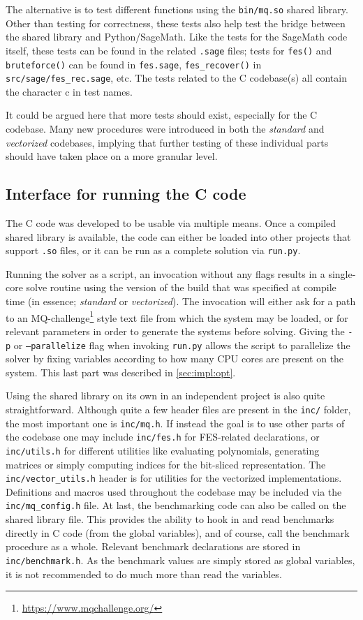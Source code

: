 The alternative is to test different functions using the \texttt{bin/mq.so} shared library. Other than testing for correctness, these tests also help test the bridge between the shared library and Python/SageMath. Like the tests for the SageMath code itself, these tests can be found in the related \texttt{.sage} files; tests for \texttt{fes()} and \texttt{bruteforce()} can be found in \texttt{fes.sage}, \texttt{fes\_recover()} in \texttt{src/sage/fes\_rec.sage}, etc. The tests related to the C codebase(s) all contain the character c in test names.

It could be argued here that more tests should exist, especially for the C codebase. Many new procedures were introduced in both the \textit{standard} and \textit{vectorized} codebases, implying that further testing of these individual parts should have taken place on a more granular level. 

\subsection{Interface for running the C code} \label{sec:impl:interface}
The C code was developed to be usable via multiple means. Once a compiled shared library is available, the code can either be loaded into other projects that support \texttt{.so} files, or it can be run as a complete solution via \texttt{run.py}. 

Running the solver as a script, an invocation without any flags results in a single-core solve routine using the version of the build that was specified at compile time (in essence; \textit{standard} or \textit{vectorized}). The invocation will either ask for a path to an MQ-challenge\footnote{\url{https://www.mqchallenge.org/}} style text file from which the system may be loaded, or for relevant parameters in order to generate the systems before solving. Giving the \texttt{-p} or \texttt{--parallelize} flag when invoking \texttt{run.py} allows the script to parallelize the solver by fixing variables according to how many CPU cores are present on the system. This last part was described in \cref{sec:impl:opt}.

Using the shared library on its own in an independent project is also quite straightforward. Although quite a few header files are present in the \texttt{inc/} folder, the most important one is \texttt{inc/mq.h}. If instead the goal is to use other parts of the codebase one may include \texttt{inc/fes.h} for FES-related declarations, or \texttt{inc/utils.h} for different utilities like evaluating polynomials, generating matrices or simply computing indices for the bit-sliced representation. The \texttt{inc/vector\_utils.h} header is for utilities for the vectorized implementations. Definitions and macros used throughout the codebase may be included via the \texttt{inc/mq\_config.h} file. At last, the benchmarking code can also be called on the shared library file. This provides the ability to hook in and read benchmarks directly in C code (from the global variables), and of course, call the benchmark procedure as a whole. Relevant benchmark declarations are stored in \texttt{inc/benchmark.h}. As the benchmark values are simply stored as global variables, it is not recommended to do much more than read the variables. 

